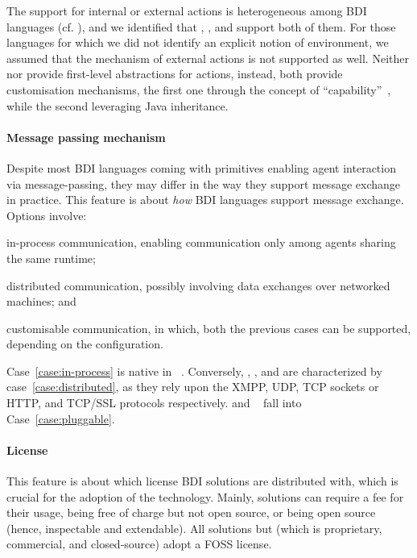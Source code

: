 The support for internal or external actions is heterogeneous among \ac{BDI} languages (cf. ),
and we identified that \jason{}, \astra{}, and \goal{} support both of them.
%
For those languages for which we did not identify an explicit notion of environment,
we assumed that the mechanism of external actions is not supported as well.
%
Neither \jack{} nor \jadex{} provide first-level abstractions for actions,
instead, both provide customisation mechanisms,
the first one through the concept of ``capability''~\cite{busetta1999structuring},
while the second leveraging Java inheritance.

\paragraph{Message passing mechanism}
%
Despite most \ac{BDI} languages coming with primitives enabling agent interaction via message-passing,
they may differ in the way they support message exchange in practice.
%
This feature is about \emph{how} \ac{BDI} languages support message exchange.
%
Options involve:
%
\begin{inlinelist}
   \item\label{case:in-process} in-process communication,
   enabling communication only among agents sharing the same runtime;
   \item\label{case:distributed} distributed communication,
   possibly involving data exchanges over networked machines;
   and
   \item\label{case:pluggable} customisable communication,
   in which, both the previous cases can be supported, depending on the configuration.
\end{inlinelist}

Case~\ref{case:in-process} is native in \goal{}~\cite{Hindriks2009}.
%
Conversely,
\spadebdi{}, \astra{}, \phidias{} and \jadex{} are characterized by case~\ref{case:distributed},
as they rely upon the XMPP, UDP, TCP sockets or HTTP, and TCP/SSL protocols respectively.
%
\jason{} and \jack{}~\cite{Winikoff2005} fall into Case~\ref{case:pluggable}.

\paragraph{License}
%
This feature is about which license \ac{BDI} solutions are distributed with,
which is crucial for the adoption of the technology.
%
Mainly,
solutions can require a fee for their usage,
being free of charge but not open source,
or being open source
(hence, inspectable and extendable).
%
All solutions but \jack{} (which is proprietary, commercial, and closed-source) adopt a \ac{FOSS} license.

